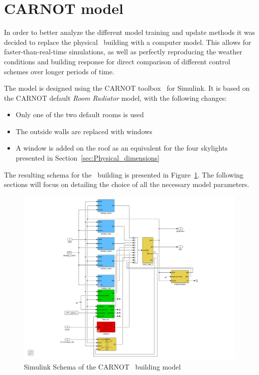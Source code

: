 \section{CARNOT model}\label{sec:CARNOT}

In order to better analyze the different model training and update methods it
was decided to replace the physical \pdome\ building with a computer model.
This allows for faster-than-real-time simulations, as well as perfectly
reproducing the weather conditions and building response for direct comparison
of different control schemes over longer periods of time.

The model is designed using the CARNOT
toolbox~\cite{lohmannEinfuehrungSoftwareMATLAB} for Simulink. It is based on the
CARNOT default \textit{Room Radiator} model, with the following changes:
\begin{itemize}
    \item Only one of the two default rooms is used
    \item The outside walls are replaced with windows
    \item A window is added on the roof as an equivalent for the four skylights
        presented in Section~\ref{sec:Physical_dimensions}
\end{itemize}

The resulting schema for the \pdome\ building is presented in
Figure~\ref{fig:CARNOT_polydome}. The following sections will focus on detailing
the choice of all the necessary model parameters.

\begin{figure}[ht]
    \centering
    \includegraphics[width = \textwidth]{Images/polydome_room_model.pdf}
    \caption{Simulink Schema of the CARNOT \pdome\ building model}
    \label{fig:CARNOT_polydome}
\end{figure}

